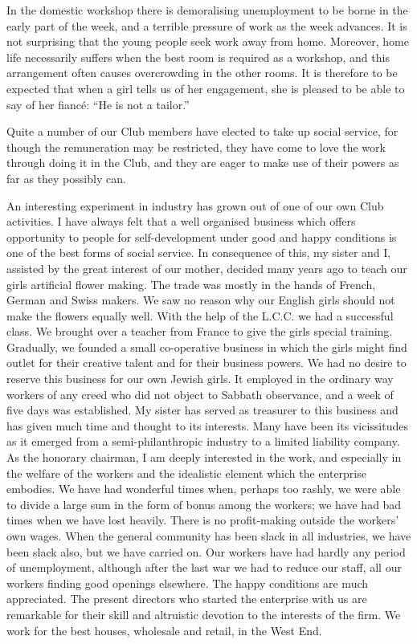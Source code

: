 In the domestic workshop there is demoralising
unemployment to be borne in the early part of the week,
and a terrible pressure of work as the week advances.
It is not surprising that the young people seek work away
from home. Moreover, home life necessarily suffers when
the best room is required as a workshop, and this arrangement
often causes overcrowding in the other rooms. It is
therefore to be expected that when a girl tells us of her
engagement, she is pleased to be able to say of her fiancé:
“He is not a tailor.”

Quite a number of our Club members have elected to
take up social service, for though the remuneration may
be restricted, they have come to love the work through
doing it in the Club, and they are eager to make use of
their powers as far as they possibly can.

An interesting experiment in industry has grown out
of one of our own Club activities. I have always felt
that a well organised business which offers opportunity
to people for self-development under good and happy
conditions is one of the best forms of social service. In
consequence of this, my sister and I, assisted by the great
interest of our mother, decided many years ago to teach
our girls artificial flower making. The trade was mostly
in the hands of French, German and Swiss makers. We
saw no reason why our English girls should not make the
flowers equally well. With the help of the L.C.C. we
had a successful class. We brought over a teacher from
France to give the girls special training. Gradually, we
founded a small co-operative business in which the girls
might find outlet for their creative talent and for their
business powers. We had no desire to reserve this business
for our own Jewish girls. It employed in the ordinary
way workers of any creed who did not object to Sabbath
observance, and a week of five days was established. My
sister has served as treasurer to this business and has given
much time and thought to its interests. Many have been
its vicissitudes as it emerged from a semi-philanthropic
industry to a limited liability company. As the honorary
chairman, I am deeply interested in the work, and especially
in the welfare of the workers and the idealistic
element which the enterprise embodies. We have had
wonderful times when, perhaps too rashly, we were able
to divide a large sum in the form of bonus among the
workers; we have had bad times when we have lost
heavily. There is no profit-making outside the workers’
own wages. When the general community has been slack
in all industries, we have been slack also, but we have
carried on. Our workers have had hardly any period
of unemployment, although after the last war we had to
reduce our staff, all our workers finding good openings
elsewhere. The happy conditions are much appreciated.
The present directors who started the enterprise with us
are remarkable for their skill and altruistic devotion to
the interests of the firm. We work for the best houses,
wholesale and retail, in the West End.

